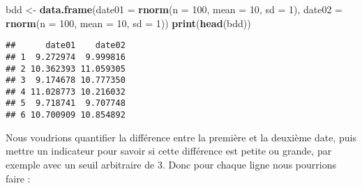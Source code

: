 \documentclass[]{book}
\newenvironment{Shaded}{\begin{snugshade}}{\end{snugshade}}
\newcommand{\KeywordTok}[1]{\textcolor[rgb]{0.13,0.29,0.53}{\textbf{#1}}}
\newcommand{\DataTypeTok}[1]{\textcolor[rgb]{0.13,0.29,0.53}{#1}}
\newcommand{\DecValTok}[1]{\textcolor[rgb]{0.00,0.00,0.81}{#1}}
\newcommand{\StringTok}[1]{\textcolor[rgb]{0.31,0.60,0.02}{#1}}
\newcommand{\NormalTok}[1]{#1}
\theoremstyle{definition}
\theoremstyle{definition}
\theoremstyle{definition}
\theoremstyle{remark}
\begin{document}
\begin{Shaded}
\begin{Highlighting}[]
\NormalTok{bdd <-}\StringTok{ }\KeywordTok{data.frame}\NormalTok{(}\DataTypeTok{date01 =} \KeywordTok{rnorm}\NormalTok{(}\DataTypeTok{n =} \DecValTok{100}\NormalTok{, }\DataTypeTok{mean =} \DecValTok{10}\NormalTok{, }\DataTypeTok{sd =} \DecValTok{1}\NormalTok{), }
                  \DataTypeTok{date02 =} \KeywordTok{rnorm}\NormalTok{(}\DataTypeTok{n =} \DecValTok{100}\NormalTok{, }\DataTypeTok{mean =} \DecValTok{10}\NormalTok{, }\DataTypeTok{sd =} \DecValTok{1}\NormalTok{))}
\KeywordTok{print}\NormalTok{(}\KeywordTok{head}\NormalTok{(bdd))}
\end{Highlighting}
\end{Shaded}

\begin{verbatim}
##      date01    date02
## 1  9.272974  9.999816
## 2 10.362393 11.059305
## 3  9.174678 10.777350
## 4 11.028773 10.216032
## 5  9.718741  9.707748
## 6 10.700909 10.854892
\end{verbatim}

Nous voudrions quantifier la différence entre la première et la deuxième
date, puis mettre un indicateur pour savoir si cette différence est
petite ou grande, par exemple avec un seuil arbitraire de 3. Donc pour
chaque ligne nous pourrions faire :
\end{document}

